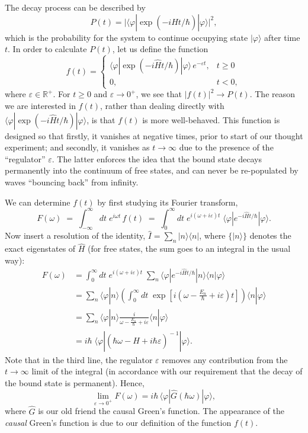 \documentclass[pra,12pt]{revtex4}
\begin{document}
The decay process can be described by
$$P(t) = \Big|\langle\varphi|\exp\left(-i\hat{H}t/\hbar\right)|\varphi\rangle\Big|^2,$$
which is the probability for the system to continue occupying state
$|\varphi\rangle$ after time $t$.  In order to calculate $P(t)$, let
us define the function
$$f(t) = \begin{cases} \langle\varphi|\exp\left(-i\hat{H}t/\hbar\right)|\varphi\rangle \,e^{-\varepsilon t}, & t \ge 0 \\ 0, & t < 0,\end{cases}$$
where $\varepsilon \in \mathbb{R}^+$.  For $t \ge 0$ and $\varepsilon
\rightarrow 0^+$, we see that $|f(t)|^2 \rightarrow P(t)$.  The reason
we are interested in $f(t)$, rather than dealing directly with
$\langle\varphi|\exp(-i\hat{H}t/\hbar)|\varphi\rangle$, is that $f(t)$
is more well-behaved.  This function is designed so that firstly, it
vanishes at negative times, prior to start of our thought experiment;
and secondly, it vanishes as $t\rightarrow\infty$ due to the presence
of the ``regulator'' $\varepsilon$.  The latter enforces the idea that
the bound state decays permanently into the continuum of free states,
and can never be re-populated by waves ``bouncing back'' from
infinity.

We can determine $f(t)$ by first studying its Fourier transform,
$$F(\omega) \;=\; \int_{-\infty}^\infty dt \; e^{i\omega t}\, f(t) \;=\; \int_0^\infty dt \; e^{i(\omega + i\varepsilon) t} \; \langle\varphi|e^{-i\hat{H}t/\hbar}|\varphi\rangle.$$
Now insert a resolution of the identity, $\hat{I} = \sum_n
|n\rangle\langle n|$, where $\{|n\rangle\}$ denotes the exact
eigenstates of $\hat{H}$ (for free states, the sum goes to an integral
in the usual way):
$$\begin{aligned}F(\omega) &= \int_0^\infty dt \; e^{i(\omega + i\varepsilon) t} \; \sum_n \langle\varphi|e^{-i\hat{H}t/\hbar}|n\rangle\langle n|\varphi\rangle \\ &= \sum_n \langle\varphi|n\rangle \left( \int_0^\infty dt \; \exp\left[i\left(\omega - \frac{E_n}{\hbar} + i\varepsilon\right) t\right] \right) \langle n|\varphi\rangle \\ &= \sum_n \langle\varphi|n\rangle \frac{i}{\omega - \frac{E_n}{\hbar} + i \varepsilon} \langle n|\varphi\rangle \\ &= i \hbar\; \langle \varphi | \left(\hbar\omega - \hat{H} + i\hbar\varepsilon \right)^{\!-1} | \varphi\rangle. \end{aligned}$$
Note that in the third line, the regulator $\varepsilon$ removes any
contribution from the $t \rightarrow\infty$ limit of the integral (in
accordance with our requirement that the decay of the bound state is
permanent).  Hence,
$$\lim_{\varepsilon \rightarrow 0^+} F(\omega) = i \hbar \, \langle \varphi | \hat{G}(\hbar\omega) | \varphi\rangle,$$
where $\hat{G}$ is our old friend the causal Green's function.  The
appearance of the \textit{causal} Green's function is due to our
definition of the function $f(t)$.
\end{document}
